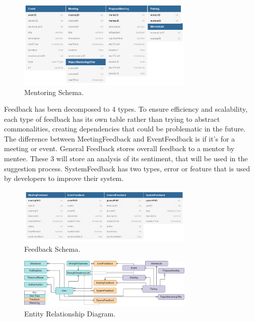 \documentclass[10pt]{article}
\begin{document}
\begin{figure}[H]
    \centering
    \includegraphics[width=0.75\textwidth]{MentoringDB}
    \caption{Mentoring Schema.}
    \label{fig:Mentoring Schema}
\end{figure}

Feedback has been decomposed to 4 types. To ensure efficiency and scalability,
each type of feedback has its own table rather than trying to abstract
commonalities, creating dependencies that could be problematic in the future.
The difference between MeetingFeedback and EventFeedback is if it's for a
meeting or event. General Feedback stores overall feedback to a mentor by
mentee. These 3 will store an analysis of its sentiment, that will be used in
the suggestion process. SystemFeedback has two types, error or feature that is
used by developers to improve their system.

\begin{figure}[H]
    \centering
    \includegraphics[width=0.75\textwidth]{FeedbackDB}
    \caption{Feedback Schema.}
    \label{fig:Feedback Schema}
\end{figure}



\begin{figure}[H]
    \centering
    \includegraphics[width=0.75\textwidth]{ER}
    \caption{Entity Relationship Diagram.}
    \label{fig:Entity Diagram}
\end{figure}
\end{document}
